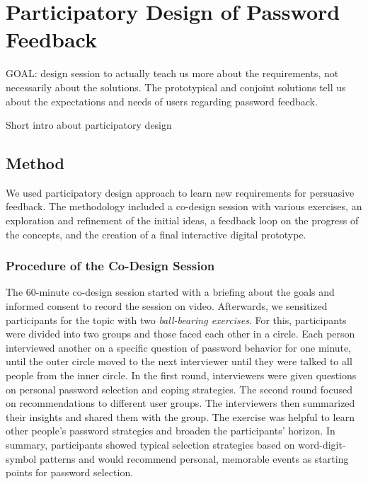 \section{Participatory Design of Password Feedback}
GOAL: design session to actually teach us more about the requirements, not necessarily about the solutions. The prototypical and conjoint solutions tell us about the expectations and needs of users regarding password feedback. 


Short intro about participatory design \cite{Sanders2002ParticipatoryDesign}

\subsection{Method}
We used participatory design approach to learn new requirements for persuasive feedback. The methodology included a co-design session with various exercises, an exploration and refinement of the initial ideas, a feedback loop on the progress of the concepts, and the creation of a final interactive digital prototype.

\subsubsection{Procedure of the Co-Design Session}
The 60-minute co-design session started with a briefing about the goals and informed consent to record the session on video. Afterwards, we sensitized participants for the topic with two \textit{ball-bearing exercises}. For this, participants were divided into two groups and those faced each other in a circle. Each person interviewed another on a specific question of password behavior for one minute, until the outer circle moved to the next interviewer until they were talked to all people from the inner circle. In the first round, interviewers were given questions on personal password selection and coping strategies. The second round focused on recommendations to different user groups. The interviewers then summarized their insights and shared them with the group. The exercise was helpful to learn other people's password strategies and broaden the participants' horizon. In summary, participants showed typical selection strategies based on word-digit-symbol patterns and would recommend personal, memorable events as starting points for password selection.

